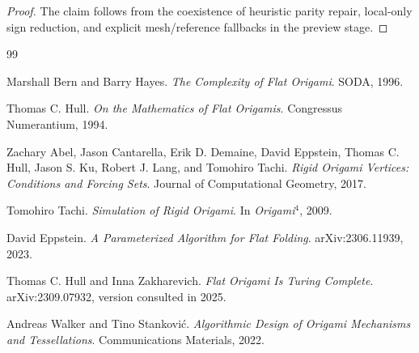 \documentclass[11pt]{article}
\theoremstyle{remark}
\begin{document}
\begin{proof}
The claim follows from the coexistence of heuristic parity repair, local-only
sign reduction, and explicit mesh/reference fallbacks in the preview stage.
\end{proof}

\begin{thebibliography}{99}

Marshall Bern and Barry Hayes.
\newblock \emph{The Complexity of Flat Origami}.
\newblock SODA, 1996.

Thomas C. Hull.
\newblock \emph{On the Mathematics of Flat Origamis}.
\newblock Congressus Numerantium, 1994.

Zachary Abel, Jason Cantarella, Erik D. Demaine, David Eppstein, Thomas C.
Hull, Jason S. Ku, Robert J. Lang, and Tomohiro Tachi.
\newblock \emph{Rigid Origami Vertices: Conditions and Forcing Sets}.
\newblock Journal of Computational Geometry, 2017.

Tomohiro Tachi.
\newblock \emph{Simulation of Rigid Origami}.
\newblock In \emph{Origami$^4$}, 2009.

David Eppstein.
\newblock \emph{A Parameterized Algorithm for Flat Folding}.
\newblock arXiv:2306.11939, 2023.

Thomas C. Hull and Inna Zakharevich.
\newblock \emph{Flat Origami Is Turing Complete}.
\newblock arXiv:2309.07932, version consulted in 2025.

Andreas Walker and Tino Stankovi\'c.
\newblock \emph{Algorithmic Design of Origami Mechanisms and Tessellations}.
\newblock Communications Materials, 2022.

\end{thebibliography}
\end{document}
